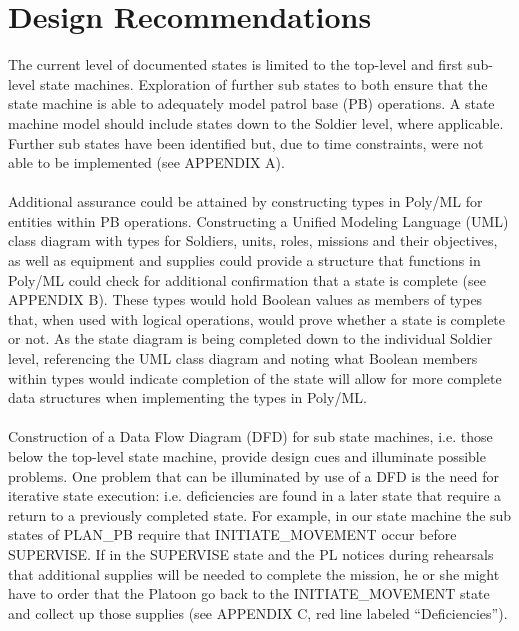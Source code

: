 
\section{Design Recommendations}
\label{sec:design-recomm}

The current level of documented states is limited to the top-level and
first sub-level state machines. Exploration of further sub states to
both ensure that the state machine is able to adequately model patrol
base (PB) operations. A state machine model should include states down
to the Soldier level, where applicable. Further sub states have been
identified but, due to time constraints, were not able to be implemented
(see APPENDIX A).\\\\
Additional assurance could be attained by constructing types in Poly/ML
for entities within PB operations. Constructing a Unified Modeling Language
(UML) class diagram with types for Soldiers, units, roles, missions and
their objectives, as well as equipment and supplies could provide a structure
that functions in Poly/ML could check for additional confirmation that a
state is complete (see APPENDIX B). These types would hold Boolean values
as members of types that, when used with logical operations, would prove
whether a state is complete or not. As the state diagram is being completed
down to the individual Soldier level, referencing the UML class diagram and
noting what Boolean members within types would indicate completion of the
state will allow for more complete data structures when implementing the
types in Poly/ML.\\\\
Construction of a Data Flow Diagram (DFD) for sub state machines, i.e.
those below the top-level state machine, provide design cues and illuminate
possible problems. One problem that can be illuminated by use of a DFD is
the need for iterative state execution: i.e. deficiencies are found in a
later state that require a return to a previously completed state. For
example, in our state machine the sub states of PLAN_PB require that
INITIATE_MOVEMENT occur before SUPERVISE. If in the SUPERVISE state and
the PL notices during rehearsals that additional supplies will be needed
to complete the mission, he or she might have to order that the Platoon go
back to the INITIATE_MOVEMENT state and collect up those supplies (see
APPENDIX C, red line labeled “Deficiencies”).\\\\